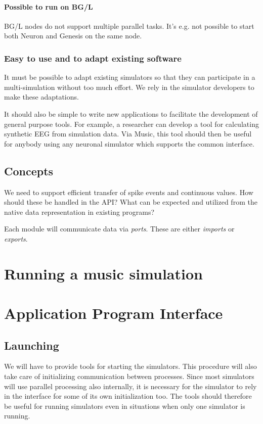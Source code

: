 \documentclass[a4paper]{report}
\begin{document}
\subsubsection{Possible to run on BG/L}

BG/L nodes do not support multiple parallel tasks.  It's e.g. not
possible to start both Neuron and Genesis on the same node.


\subsection{Easy to use and to adapt existing software}

It must be possible to adapt existing simulators so that they can
participate in a multi-simulation without too much effort.  We rely in
the simulator developers to make these adaptations.

It should also be simple to write new applications to facilitate the
development of general purpose tools.  For example, a researcher can
develop a tool for calculating synthetic EEG from simulation data.
Via Music, this tool should then be useful for anybody using any
neuronal simulator which supports the common interface.


\section{Concepts}

We need to support efficient transfer of spike events and continuous
values.  How should these be handled in the API?  What can be expected
and utilized from the native data representation in existing programs?

Each module will communicate data via \emph{ports}.  These are either
\emph{imports} or \emph{exports}.


\chapter{Running a music simulation}

\chapter{Application Program Interface}

\section{Launching}

We will have to provide tools for starting the simulators.  This
procedure will also take care of initializing communication between
processes.  Since most simulators will use parallel processing also
internally, it is necessary for the simulator to rely in the interface
for some of its own initialization too.  The tools should therefore be
useful for running simulators even in situations when only one
simulator is running.
\end{document}
